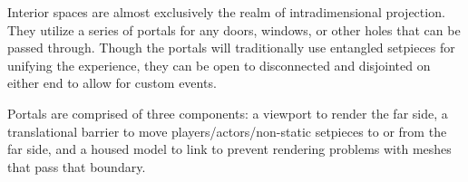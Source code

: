 Interior spaces are almost exclusively the realm of intradimensional projection. They utilize a series of portals for any doors, windows, or other holes that can be passed through. Though the portals will traditionally use entangled setpieces for unifying the experience, they can be open to disconnected and disjointed on either end to allow for custom events.

Portals are comprised of three components: a viewport to render the far side, a translational barrier to move players/actors/non-static setpieces to or from the far side, and a housed model to link to prevent rendering problems with meshes that pass that boundary. 